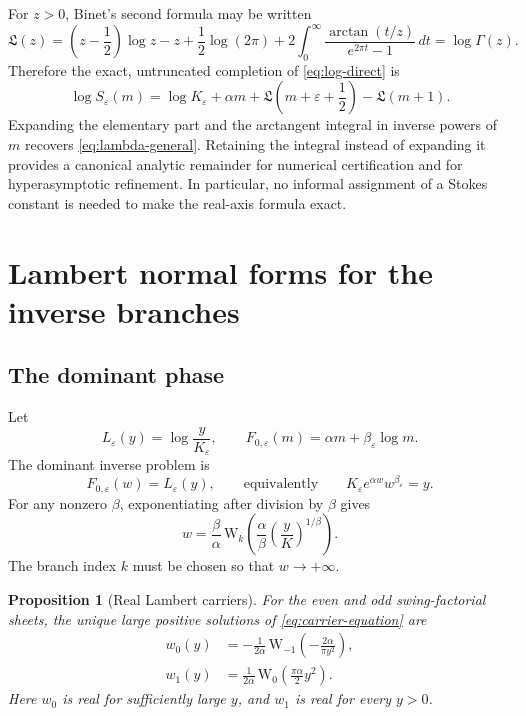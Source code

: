 \documentclass[11pt,a4paper]{article}
\theoremstyle{clean}
\newtheorem{proposition}[theorem]{Proposition}
\theoremstyle{definition}
\newcommand{\eps}{\varepsilon}
\newcommand{\al}{\alpha}
\newcommand{\be}{\beta}
\newcommand{\W}{\mathrm W}
\begin{document}
For \(z>0\), Binet's second formula may be written
\begin{equation}
 \mathfrak L(z)=
 \left(z-\frac12\right)\log z-z+\frac12\log(2\pi)
 +2\int_0^\infty\frac{\arctan(t/z)}{e^{2\pi t}-1}\,dt
 =\log\Gamma(z).
 \label{eq:Binet}
\end{equation}
Therefore the exact, untruncated completion of \cref{eq:log-direct} is
\begin{equation}
 \boxed{\displaystyle
 \log S_\eps(m)=\log K_\eps+\al m+
 \mathfrak L\!\left(m+\eps+\frac12\right)-\mathfrak L(m+1).}
 \label{eq:exact-Binet-swing}
\end{equation}
Expanding the elementary part and the arctangent integral in inverse powers of \(m\) recovers \cref{eq:lambda-general}.  Retaining the integral instead of expanding it provides a canonical analytic remainder for numerical certification and for hyperasymptotic refinement.  In particular, no informal assignment of a Stokes constant is needed to make the real-axis formula exact.

\section{Lambert normal forms for the inverse branches}
\label{sec:Lambert}

\subsection{The dominant phase}

Let
\begin{equation}
 L_\eps(y)=\log\frac{y}{K_\eps},
 \qquad
 F_{0,\eps}(m)=\al m+\be_\eps\log m.
 \label{eq:L-F0}
\end{equation}
The dominant inverse problem is
\begin{equation}
 F_{0,\eps}(w)=L_\eps(y),
 \qquad\text{equivalently}\qquad
 K_\eps e^{\al w}w^{\be_\eps}=y.
 \label{eq:carrier-equation}
\end{equation}
For any nonzero \(\be\), exponentiating after division by \(\be\) gives
\begin{equation}
 w=\frac{\be}{\al}\,
 \W_k\!\left(
 \frac{\al}{\be}
 \left(\frac{y}{K}\right)^{1/\be}
 \right).
 \label{eq:generic-Lambert-core}
\end{equation}
The branch index \(k\) must be chosen so that \(w\to+\infty\).

\begin{proposition}[Real Lambert carriers]
\label{prop:Lambert-carriers}
For the even and odd swing-factorial sheets, the unique large positive solutions of \cref{eq:carrier-equation} are
\begin{align}
 w_0(y)&=-\frac1{2\al}\,
 \W_{-1}\!\left(-\frac{2\al}{\pi y^2}\right),
 \label{eq:w0}\\
 w_1(y)&=\frac1{2\al}\,
 \W_0\!\left(\frac{\pi\al}{2}y^2\right).
 \label{eq:w1}
\end{align}
Here \(w_0\) is real for sufficiently large \(y\), and \(w_1\) is real for every \(y>0\).
\end{proposition}
\end{document}
